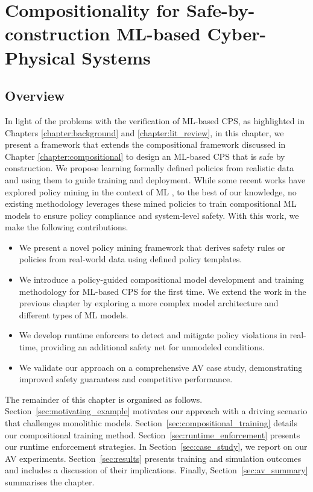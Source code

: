 \chapter{Compositionality for Safe-by-construction ML-based Cyber-Physical Systems} \label{chapter:av}
\glsresetall




\section{Overview}

In light of the problems with the verification of ML-based CPS, as highlighted in Chapters \ref{chapter:background} and \ref{chapter:lit_review}, in this chapter, we present a framework that extends the compositional framework discussed in Chapter \ref{chapter:compositional} to design an ML-based CPS that is safe by construction. We propose learning formally defined policies from realistic data and using them to guide training and deployment. While some recent works have explored policy mining in the context of ML \cite{10.5555/1625015.1625078, panda_explainable_2024}, to the best of our knowledge, no existing methodology leverages these mined policies to train compositional ML models to ensure policy compliance and system-level safety. With this work, we make the following contributions.
\begin{itemize}
    \item We present a novel policy mining framework that derives safety rules or policies from real-world data using defined policy templates. 
    \item We introduce a policy-guided compositional model development and training methodology for ML-based CPS for the first time. We extend the work in the previous chapter by exploring a more complex model architecture and different types of ML models.
    \item We develop runtime enforcers to detect and mitigate policy violations in real-time, providing an additional safety net for unmodeled conditions.
    \item We validate our approach on a comprehensive AV case study, demonstrating improved safety guarantees and competitive performance.
\end{itemize}

 
The remainder of this chapter is organised as follows. Section~\ref{sec:motivating_example} motivates our approach with a driving scenario that challenges monolithic models. Section~\ref{sec:compositional_training} details our compositional training method. Section~\ref{sec:runtime_enforcement} presents our runtime enforcement strategies. In Section~\ref{sec:case_study}, we report on our AV experiments. Section~\ref{sec:results} presents training and simulation outcomes and includes a discussion of their implications. Finally, Section~\ref{sec:av_summary} summarises the chapter.



